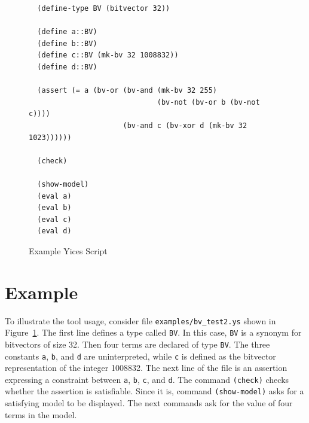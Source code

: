 \documentclass[11pt,twoside,fleqn,openright,titlepage]{cslreport}
\begin{document}
\begin{figure}[ht]
\begin{footnotesize}
\begin{verbatim}
  (define-type BV (bitvector 32))

  (define a::BV)
  (define b::BV)
  (define c::BV (mk-bv 32 1008832))
  (define d::BV)

  (assert (= a (bv-or (bv-and (mk-bv 32 255)
                              (bv-not (bv-or b (bv-not c))))
                      (bv-and c (bv-xor d (mk-bv 32 1023))))))

  (check)

  (show-model)
  (eval a)
  (eval b)
  (eval c)
  (eval d)
\end{verbatim}
\end{footnotesize}
\caption{Example Yices Script}
\label{example:bv_test2}
\end{figure}

\section{Example}

To      illustrate     the      tool     usage,      consider     file
\texttt{examples/bv\_test2.ys} shown in Figure~\ref{example:bv_test2}.
The  first line  defines  a  type called  \texttt{BV}.  In this  case,
\texttt{BV} is  a synonym for bitvectors  of size 32. Then  four terms
are  declared of  type \texttt{BV}.   The three  constants \texttt{a},
\texttt{b},  and \texttt{d}  are  uninterpreted,  while \texttt{c}  is
defined as  the bitvector representation  of the integer  1008832. The
next line of the file is  an assertion expressing a constraint between
\texttt{a},  \texttt{b},  \texttt{c},   and  \texttt{d}.  The  command
\texttt{(check)} checks whether the assertion is satisfiable. Since it
is, command  \texttt{(show-model)} asks for  a satisfying model  to be
displayed. The  next commands ask for  the value of four  terms in the
model.
\end{document}
